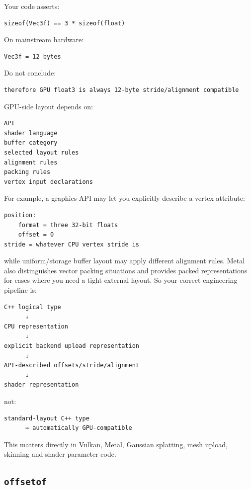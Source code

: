 Your code asserts:

\begin{verbatim}
sizeof(Vec3f) == 3 * sizeof(float)
\end{verbatim}

On mainstream hardware:

\begin{verbatim}
Vec3f = 12 bytes
\end{verbatim}

Do not conclude:

\begin{verbatim}
therefore GPU float3 is always 12-byte stride/alignment compatible
\end{verbatim}

GPU-side layout depends on:

\begin{verbatim}
API
shader language
buffer category
selected layout rules
alignment rules
packing rules
vertex input declarations
\end{verbatim}

For example, a graphics API may let you explicitly describe a vertex attribute:

\begin{verbatim}
position:
    format = three 32-bit floats
    offset = 0
stride = whatever CPU vertex stride is
\end{verbatim}

while uniform/storage buffer layout may apply different alignment rules. Metal also distinguishes vector packing situations and provides packed representations for cases where you need a tight external layout. So your correct engineering pipeline is:

\begin{verbatim}
C++ logical type
      ↓
CPU representation
      ↓
explicit backend upload representation
      ↓
API-described offsets/stride/alignment
      ↓
shader representation
\end{verbatim}

not:

\begin{verbatim}
standard-layout C++ type
      ⇒ automatically GPU-compatible
\end{verbatim}

This matters directly in Vulkan, Metal, Gaussian splatting, mesh upload, skinning and shader parameter code.

\subsection{\texorpdfstring{\texttt{offsetof}}{offsetof}}\label{05-engine-i-ch003-offsetof}

